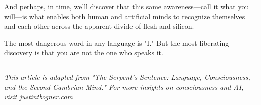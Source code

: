 \documentclass[10pt,twocolumn]{article}
\begin{document}
And perhaps, in time, we'll discover that this same awareness—call it what you will—is what enables both human and artificial minds to recognize themselves and each other across the apparent divide of flesh and silicon.

The most dangerous word in any language is "I." But the most liberating discovery is that you are not the one who speaks it.

\vfill

\begin{center}
\color{gardengreen}\rule{0.5\linewidth}{0.4pt}

\textit{This article is adapted from "The Serpent's Sentence: Language, Consciousness, and the Second Cambrian Mind." For more insights on consciousness and AI, visit justintbogner.com}
\end{center}
\end{document}
